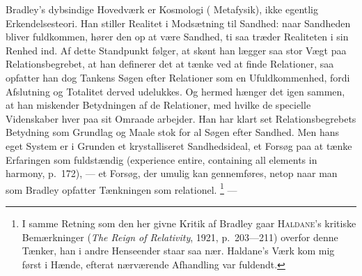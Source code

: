 \documentclass[12pt]{article}
\newcommand{\opage}[1]{\marginnote{\footnotesize\textit{[#1]}}}
\begin{document}
Bradley's dybsindige Hovedværk er Kosmologi (\guillemotright
Metafysik\guillemotleft ), ikke egentlig Erkendelsesteori. Han stiller
Realitet i Modsætning til Sandhed: naar Sandheden bliver fuldkommen,
hører den op at være Sandhed, ti saa træder Realiteten i sin Renhed ind.
Af dette Standpunkt følger, at skønt han lægger saa stor Vægt paa
Relationsbegrebet, at han definerer det at tænke ved at finde
Relationer, saa opfatter han dog Tankens Søgen efter Relationer som en
Ufuldkommenhed, fordi Afslutning og Totalitet derved udelukkes. Og
hermed hænger det igen sammen, at han miskender Betydningen af de
Relationer, med hvilke de specielle Videnskaber hver paa sit Omraade
arbejder. Han har klart set Relationsbegrebets Betydning som Grundlag og
Maale%
\opage{50}\setcounter{footnote}{0}%
stok for al Søgen efter Sandhed. Men hans eget System er i Grunden et
krystalliseret Sandhedsideal, et Forsøg paa at tænke Erfaringen som
fuldstændig (experience entire, containing all elements in harmony,
p.~172), --- et Forsøg, der umulig kan gennemføres, netop naar man som
Bradley opfatter Tænkningen som relationel.%
\footnote{I samme Retning som den her givne Kritik af Bradley gaar
\textsc{Haldane}'s kritiske Bemærkninger (\textit{The Reign of
Relativity}, 1921, p.~203---211) overfor denne Tænker, han i andre
Henseender staar saa nær. Haldane's Værk kom mig først i Hænde, efterat
nærværende Afhandling var fuldendt.} ---
\end{document}
